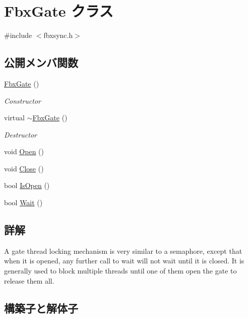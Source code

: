 \hypertarget{class_fbx_gate}{}\section{Fbx\+Gate クラス}
\label{class_fbx_gate}


{\ttfamily \#include $<$fbxsync.\+h$>$}

\subsection*{公開メンバ関数}
\begin{DoxyCompactItemize}
\item 
\hyperlink{class_fbx_gate_a0bfa381894e420784ea2cee86d5f8662}{Fbx\+Gate} ()
\begin{DoxyCompactList}\small\item\em Constructor \end{DoxyCompactList}\item 
virtual \hyperlink{class_fbx_gate_a588ebab279f8bd182bc0a1aeb6001554}{$\sim$\+Fbx\+Gate} ()
\begin{DoxyCompactList}\small\item\em Destructor \end{DoxyCompactList}\item 
void \hyperlink{class_fbx_gate_acd9a45eb0ef7d06f2a4a7f5954555310}{Open} ()
\item 
void \hyperlink{class_fbx_gate_aa91ba9c41757e0065d400f254a5175ee}{Close} ()
\item 
bool \hyperlink{class_fbx_gate_a96baa45cb4fa4a655201355601b6bc47}{Is\+Open} ()
\item 
bool \hyperlink{class_fbx_gate_ad3d9e530f43a6f446c2d09364153c918}{Wait} ()
\end{DoxyCompactItemize}


\subsection{詳解}
A gate thread locking mechanism is very similar to a semaphore, except that when it is opened, any further call to wait will not wait until it is closed. It is generally used to block multiple threads until one of them open the gate to release them all. 

\subsection{構築子と解体子}
\mbox{\label{class_fbx_gate_a0bfa381894e420784ea2cee86d5f8662}} 
